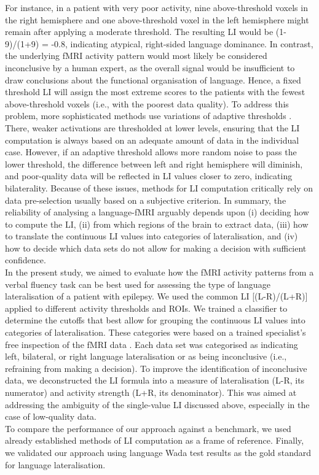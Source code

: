 \documentclass[fleqn,10pt]{SelfArx} %
\begin{document}
For instance, in a patient with very poor activity, nine above-threshold voxels in the right hemisphere and one above-threshold voxel in the left hemisphere might remain after applying a moderate threshold. The resulting LI would be (1-9)/(1+9) = -0.8, indicating atypical, right-sided language dominance. In contrast, the underlying fMRI activity pattern would most likely be considered inconclusive by a human expert, as the overall signal would be insufficient to draw conclusions about the functional organisation of language. Hence, a fixed threshold LI will assign the most extreme scores to the patients with the fewest above-threshold voxels (i.e., with the poorest data quality). To address this problem, more sophisticated methods use variations of adaptive thresholds \citep{Wilke_2007}. There, weaker activations are thresholded at lower levels, ensuring that the LI computation is always based on an adequate amount of data in the individual case. However, if an adaptive threshold allows more random noise to pass the lower threshold, the difference between left and right hemisphere will diminish, and poor-quality data will be reflected in LI values closer to zero, indicating bilaterality. Because of these issues, methods for LI computation critically rely on data pre-selection \citep{Wilke_2007} usually based on a subjective criterion. In summary, the reliability of analysing a language-fMRI arguably depends upon (i) deciding how to compute the LI, (ii) from which regions of the brain to extract data, (iii) how to translate the continuous LI values into categories of lateralisation, and (iv) how to decide which data sets do not allow for making a decision with sufficient confidence.\\
In the present study, we aimed to evaluate how the fMRI activity patterns from a verbal fluency task can be best used for assessing the type of language lateralisation of a patient with epilepsy. We used the common LI [(L-R)/(L+R)] applied to different activity thresholds and ROIs. We trained a classifier to determine the cutoffs that best allow for grouping the continuous LI values into categories of lateralisation. These categories were based on a trained specialist’s free inspection of the fMRI data \citep{Woermann_2003}. Each data set was categorised as indicating left, bilateral, or right language lateralisation or as being inconclusive (i.e., refraining from making a decision). To improve the identification of inconclusive data, we deconstructed the LI formula into a measure of lateralisation (L-R, its numerator) and activity strength (L+R, its denominator). This was aimed at addressing the ambiguity of the single-value LI discussed above, especially in the case of low-quality data.\\
To compare the performance of our approach against a benchmark, we used already established methods of LI computation \thinspace \citep{Wilke_2006, Wilke_2007} as a frame of reference. Finally, we validated our approach using language Wada test results as the gold standard for language lateralisation.
\end{document}
